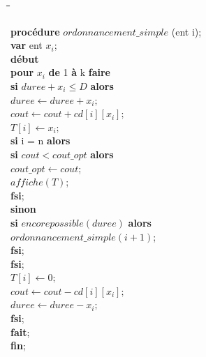 \documentclass[a4paper, titlepage]{article}
\begin{document}
			\begin{tabbing}

			\hspace{1cm}\=\hspace{1cm}\=\hspace{1cm}\=\hspace{1cm}\=\hspace{1cm}\=\kill %

			\textbf{procédure} $ordonnancement\_simple$ (ent i); \\
			\textbf{var} ent $x_{i}$; \\
			\textbf{début} \\
			\> \textbf{pour} $x_{i}$ \textbf{de} 1 \textbf{à} k \textbf{faire} \\
			\>\> \textbf{si} $duree+x_{i}\le D$ \textbf{alors} \\
			\>\>\> $duree \leftarrow duree + x_{i};$ \\
			\>\>\> $cout \leftarrow cout + cd[i][x_{i}];$ \\
			\>\>\> $T[i] \leftarrow x_{i};$ \\

			\>\>\> \textbf{si} i = n \textbf{alors} \\
			\>\>\>\> \textbf{si} $cout < cout\_opt$ \textbf{alors} \\
			\>\>\>\>\> $cout\_opt \leftarrow cout$; \\
			\>\>\>\>\> $affiche(T)$; \\
			\>\>\>\> \textbf{fsi}; \\

			\>\>\> \textbf{sinon} \\
			\>\>\>\> \textbf{si} $encorepossible (duree)$ \textbf{alors} \\
			\>\>\>\>\> $ordonnancement\_simple(i+1)$; \\
			\>\>\>\> \textbf{fsi}; \\
			\>\>\> \textbf{fsi}; \\

			\>\>\> $T[i] \leftarrow 0;$ \\
			\>\>\> $cout \leftarrow cout - cd[i][x_{i}];$ \\
			\>\>\> $duree \leftarrow duree - x_{i};	$ \\
			\>\> \textbf{fsi}; \\
			\> \textbf{fait}; \\
			\textbf{fin};

			\end{tabbing}
\end{document}
